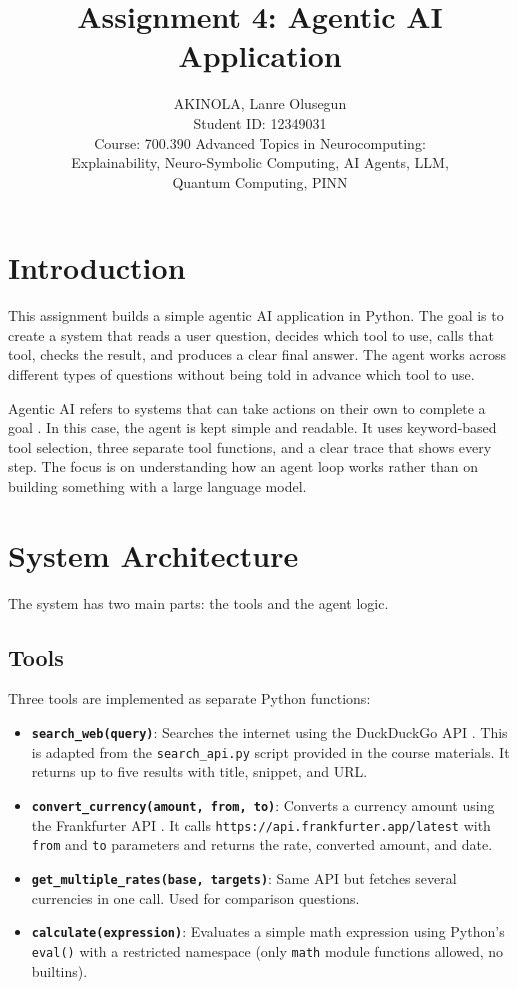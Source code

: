 \documentclass[11pt,a4paper]{article}
\title{Assignment 4: Agentic AI Application}
\author{
    AKINOLA, Lanre Olusegun \\
    Student ID: 12349031 \\
    \small Course: 700.390 Advanced Topics in Neurocomputing:\\
    \small Explainability, Neuro-Symbolic Computing, AI Agents, LLM,\\
    \small Quantum Computing, PINN
}
\date{}
\begin{document}
\maketitle

\section{Introduction}

This assignment builds a simple agentic AI application in Python. The goal is to create a system that reads a user question, decides which tool to use, calls that tool, checks the result, and produces a clear final answer. The agent works across different types of questions without being told in advance which tool to use.

Agentic AI refers to systems that can take actions on their own to complete a goal \cite{xi2023}. In this case, the agent is kept simple and readable. It uses keyword-based tool selection, three separate tool functions, and a clear trace that shows every step. The focus is on understanding how an agent loop works rather than on building something with a large language model.

\section{System Architecture}

The system has two main parts: the tools and the agent logic.

\subsection{Tools}

Three tools are implemented as separate Python functions:

\begin{itemize}
    \item \textbf{\texttt{search\_web(query)}}: Searches the internet using the DuckDuckGo API \cite{ddgs2024}. This is adapted from the \texttt{search\_api.py} script provided in the course materials. It returns up to five results with title, snippet, and URL.

    \item \textbf{\texttt{convert\_currency(amount, from, to)}}: Converts a currency amount using the Frankfurter API \cite{frankfurter}. It calls \texttt{https://api.frankfurter.app/latest} with \texttt{from} and \texttt{to} parameters and returns the rate, converted amount, and date.

    \item \textbf{\texttt{get\_multiple\_rates(base, targets)}}: Same API but fetches several currencies in one call. Used for comparison questions.

    \item \textbf{\texttt{calculate(expression)}}: Evaluates a simple math expression using Python's \texttt{eval()} with a restricted namespace (only \texttt{math} module functions allowed, no builtins).
\end{itemize}
\end{document}
